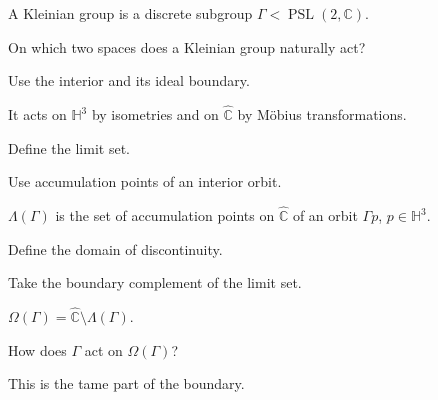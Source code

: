 \begin{solution}
A Kleinian group is a discrete subgroup \(\Gamma<\operatorname{PSL}(2,\mathbb C)\).
\end{solution}

\begin{exercise}\label{exr:vii37-02}
On which two spaces does a Kleinian group naturally act?
\end{exercise}

\begin{hint}
Use the interior and its ideal boundary.
\end{hint}

\begin{solution}
It acts on \(\mathbb H^3\) by isometries and on \(\widehat{\mathbb C}\) by Möbius transformations.
\end{solution}

\begin{exercise}\label{exr:vii37-03}
Define the limit set.
\end{exercise}

\begin{hint}
Use accumulation points of an interior orbit.
\end{hint}

\begin{solution}
\(\Lambda(\Gamma)\) is the set of accumulation points on \(\widehat{\mathbb C}\) of an orbit \(\Gamma p\), \(p\in\mathbb H^3\).
\end{solution}

\begin{exercise}\label{exr:vii37-04}
Define the domain of discontinuity.
\end{exercise}

\begin{hint}
Take the boundary complement of the limit set.
\end{hint}

\begin{solution}
\(\Omega(\Gamma)=\widehat{\mathbb C}\setminus\Lambda(\Gamma)\).
\end{solution}

\begin{exercise}\label{exr:vii37-05}
How does \(\Gamma\) act on \(\Omega(\Gamma)\)?
\end{exercise}

\begin{hint}
This is the tame part of the boundary.
\end{hint}


